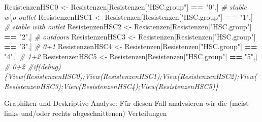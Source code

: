 \documentclass[
]{article}
\newenvironment{Shaded}{\begin{snugshade}}{\end{snugshade}}
\newcommand{\CommentTok}[1]{\textcolor[rgb]{0.56,0.35,0.01}{\textit{#1}}}
\newcommand{\NormalTok}[1]{#1}
\newcommand{\OperatorTok}[1]{\textcolor[rgb]{0.81,0.36,0.00}{\textbf{#1}}}
\newcommand{\StringTok}[1]{\textcolor[rgb]{0.31,0.60,0.02}{#1}}
\begin{document}
\begin{Shaded}
\begin{Highlighting}[]
\NormalTok{ResistenzenHSC0 <-}\StringTok{ }\NormalTok{Resistenzen[Resistenzen[}\StringTok{"HSC.group"}\NormalTok{] }\OperatorTok{==}\StringTok{ "0"}\NormalTok{,]  }\CommentTok{# stable w\textbackslash{}o  outlet}
\NormalTok{ResistenzenHSC1 <-}\StringTok{ }\NormalTok{Resistenzen[Resistenzen[}\StringTok{"HSC.group"}\NormalTok{] }\OperatorTok{==}\StringTok{ "1"}\NormalTok{,]  }\CommentTok{# stable with outlet}
\NormalTok{ResistenzenHSC2 <-}\StringTok{ }\NormalTok{Resistenzen[Resistenzen[}\StringTok{"HSC.group"}\NormalTok{] }\OperatorTok{==}\StringTok{ "2"}\NormalTok{,]  }\CommentTok{# outdoors}
\NormalTok{ResistenzenHSC3 <-}\StringTok{ }\NormalTok{Resistenzen[Resistenzen[}\StringTok{"HSC.group"}\NormalTok{] }\OperatorTok{==}\StringTok{ "3"}\NormalTok{,]  }\CommentTok{# 0+1}
\NormalTok{ResistenzenHSC4 <-}\StringTok{ }\NormalTok{Resistenzen[Resistenzen[}\StringTok{"HSC.group"}\NormalTok{] }\OperatorTok{==}\StringTok{ "4"}\NormalTok{,]  }\CommentTok{# 1+2}
\NormalTok{ResistenzenHSC5 <-}\StringTok{ }\NormalTok{Resistenzen[Resistenzen[}\StringTok{"HSC.group"}\NormalTok{] }\OperatorTok{==}\StringTok{ "5"}\NormalTok{,]  }\CommentTok{# 0+2}
\CommentTok{#if(debug)\{View(ResistenzenHSC0);View(ResistenzenHSC1);View(ResistenzenHSC2);View(ResistenzenHSC3);View(ResistenzenHSC4);View(ResistenzenHSC5)\}}
\end{Highlighting}
\end{Shaded}

Graphiken und Deskriptive Analyse: Für diesen Fall analysieren wir die
(meist links und/oder rechts abgeschnittenen) Verteilungen
\end{document}
